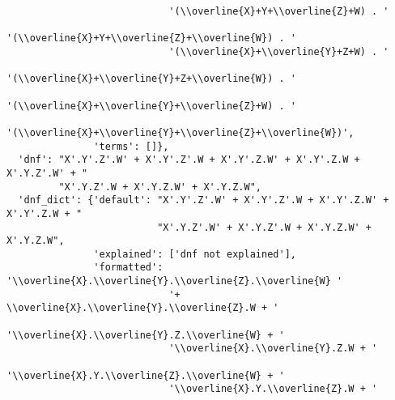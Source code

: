 \begin{verbatim}
                            '(\\overline{X}+Y+\\overline{Z}+W) . '
                            '(\\overline{X}+Y+\\overline{Z}+\\overline{W}) . '
                            '(\\overline{X}+\\overline{Y}+Z+W) . '
                            '(\\overline{X}+\\overline{Y}+Z+\\overline{W}) . '
                            '(\\overline{X}+\\overline{Y}+\\overline{Z}+W) . '
                            '(\\overline{X}+\\overline{Y}+\\overline{Z}+\\overline{W})',
               'terms': []},
  'dnf': "X'.Y'.Z'.W' + X'.Y'.Z'.W + X'.Y'.Z.W' + X'.Y'.Z.W + X'.Y.Z'.W' + "
         "X'.Y.Z'.W + X'.Y.Z.W' + X'.Y.Z.W",
  'dnf_dict': {'default': "X'.Y'.Z'.W' + X'.Y'.Z'.W + X'.Y'.Z.W' + X'.Y'.Z.W + "
                          "X'.Y.Z'.W' + X'.Y.Z'.W + X'.Y.Z.W' + X'.Y.Z.W",
               'explained': ['dnf not explained'],
               'formatted': '\\overline{X}.\\overline{Y}.\\overline{Z}.\\overline{W} '
                            '+ \\overline{X}.\\overline{Y}.\\overline{Z}.W + '
                            '\\overline{X}.\\overline{Y}.Z.\\overline{W} + '
                            '\\overline{X}.\\overline{Y}.Z.W + '
                            '\\overline{X}.Y.\\overline{Z}.\\overline{W} + '
                            '\\overline{X}.Y.\\overline{Z}.W + '

\end{verbatim}
